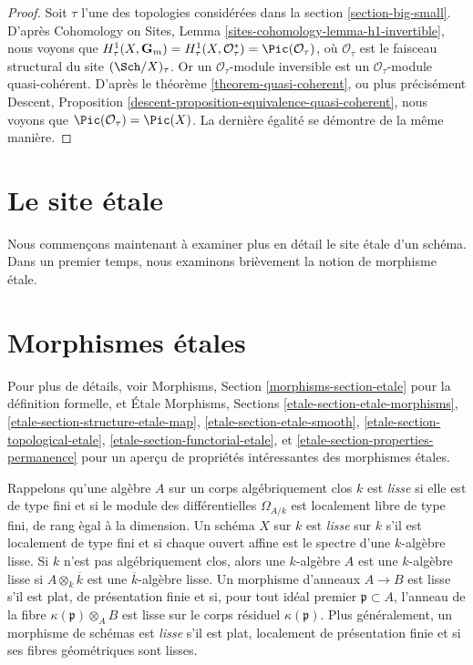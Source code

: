 \begin{proof}
Soit $\tau$ l'une des topologies consid\'er\'ees dans la
section \ref{section-big-small}.
D'apr\`es
Cohomology on Sites, Lemma
\ref{sites-cohomology-lemma-h1-invertible},
nous voyons que
$H^1_\tau(X, \mathbf{G}_m) =
H^1_\tau(X, \mathcal{O}_\tau^*) =
\Pic(\mathcal{O}_\tau)$,
o\`u $\mathcal{O}_\tau$ est le faisceau structural du site
$(\Sch/X)_\tau$. Or un $\mathcal{O}_\tau$-module inversible
est un $\mathcal{O}_\tau$-module quasi-coh\'erent.
D'apr\`es le th\'eor\`eme \ref{theorem-quasi-coherent}, ou plus pr\'ecis\'ement
Descent, Proposition \ref{descent-proposition-equivalence-quasi-coherent},
nous voyons que $\Pic(\mathcal{O}_\tau) = \Pic(X)$.
La derni\`ere \'egalit\'e se d\'emontre de la m\^eme mani\`ere.
\end{proof}






\section{Le site \'etale}
\label{section-etale-site}

\noindent
Nous commen\c{c}ons maintenant \`a examiner plus en d\'etail le site \'etale d'un
sch\'ema. Dans un premier temps, nous examinons bri\`evement la notion de
morphisme \'etale.





\section{Morphismes \'etales}
\label{section-etale-morphism}

\noindent
Pour plus de d\'etails, voir
Morphisms, Section \ref{morphisms-section-etale}
pour la d\'efinition formelle, et
\'Etale Morphisms, Sections
\ref{etale-section-etale-morphisms},
\ref{etale-section-structure-etale-map},
\ref{etale-section-etale-smooth},
\ref{etale-section-topological-etale},
\ref{etale-section-functorial-etale}, et
\ref{etale-section-properties-permanence}
pour un aper\c{c}u de propri\'et\'es int\'eressantes des morphismes \'etales.

\medskip\noindent
Rappelons qu'une alg\`ebre $A$ sur un corps alg\'ebriquement clos $k$ est
{\it lisse} si elle est de type fini et si le module des diff\'erentielles
$\Omega_{A/k}$ est localement libre de type fini, de rang \`egal \`a la dimension.
Un sch\'ema $X$ sur $k$ est {\it lisse} sur $k$ s'il est localement de type
fini et si chaque ouvert affine est le spectre d'une $k$-alg\`ebre lisse.
Si $k$ n'est pas alg\'ebriquement clos, alors une $k$-alg\`ebre $A$ est
une $k$-alg\`ebre lisse si $A \otimes_k \overline{k}$ est une
$\overline{k}$-alg\`ebre lisse. Un morphisme d'anneaux $A \to B$ est lisse s'il est
plat, de pr\'esentation finie et si, pour tout id\'eal premier $\mathfrak p \subset A$,
l'anneau de la fibre $\kappa(\mathfrak p) \otimes_A B$ est lisse sur le corps
r\'esiduel $\kappa(\mathfrak p)$. Plus g\'en\'eralement, un morphisme de sch\'emas est
{\it lisse} s'il est plat, localement de pr\'esentation finie et si ses
fibres g\'eom\'etriques sont lisses.

